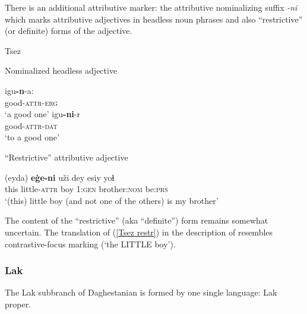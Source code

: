There is an additional attributive marker: the attributive nominalizing suffix \textit{-ni} which marks attributive adjectives in headless noun phrases and also “restrictive” (or definite) forms of the adjective.
\begin{exe}
\ex 
\rm{Tsez \citep{alekseev-etal2004}}
\begin{xlist}
\ex	
\rm{Nominalized headless adjective}
\begin{xlist}
\ex
\gll	igu\textbf{-n}-a:\\
	good-\textsc{attr}-\textsc{erg}\\
\glt	‘a good one’
\ex
\gll	igu\textbf{-ni}-r\\
	good-\textsc{attr}-\textsc{dat}\\
\glt	‘to a good one’
\end{xlist}

\ex	
\rm{“Restrictive” attributive adjective}
\begin{xlist}
\ex	
\label{Tsez restr}
\gll	(eyda) \textbf{eġe-ni} uži dey esiy yoɬ\\
	this little-\textsc{attr} boy \textsc{1:gen} brother:\textsc{nom} be:\textsc{prs}\\
\glt	‘(this) little boy (and not one of the others) is my brother’
\end{xlist}
\end{xlist}
\end{exe}
The content of the “restrictive” (aka “definite”) form remains somewhat uncertain. The translation of (\ref{Tsez restr}) in the description of \citet[128]{alekseev-etal2004} resembles contrastive-focus marking (‘the LITTLE boy’).

\subsubsection{Lak}
The Lak subbranch of Daghestanian is formed by one single language: Lak proper.

